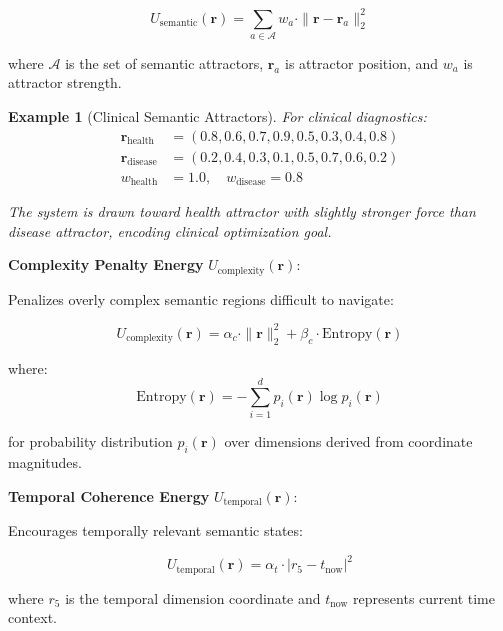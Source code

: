 \documentclass[12pt,a4paper]{article}
\newtheorem{example}{Example}
\begin{document}
\begin{equation}
U_{\text{semantic}}(\mathbf{r}) = \sum_{a \in \mathcal{A}} w_a \cdot \|\mathbf{r} - \mathbf{r}_a\|_2^2
\end{equation}

where $\mathcal{A}$ is the set of semantic attractors, $\mathbf{r}_a$ is attractor position, and $w_a$ is attractor strength.

\begin{example}[Clinical Semantic Attractors]
For clinical diagnostics:
\begin{align}
\mathbf{r}_{\text{health}} &= (0.8, 0.6, 0.7, 0.9, 0.5, 0.3, 0.4, 0.8) \\
\mathbf{r}_{\text{disease}} &= (0.2, 0.4, 0.3, 0.1, 0.5, 0.7, 0.6, 0.2) \\
w_{\text{health}} &= 1.0, \quad w_{\text{disease}} = 0.8
\end{align}

The system is drawn toward health attractor with slightly stronger force than disease attractor, encoding clinical optimization goal.
\end{example}

\textbf{Complexity Penalty Energy} $U_{\text{complexity}}(\mathbf{r})$:

Penalizes overly complex semantic regions difficult to navigate:

\begin{equation}
U_{\text{complexity}}(\mathbf{r}) = \alpha_c \cdot \|\mathbf{r}\|_2^2 + \beta_c \cdot \text{Entropy}(\mathbf{r})
\end{equation}

where:
\begin{equation}
\text{Entropy}(\mathbf{r}) = -\sum_{i=1}^d p_i(\mathbf{r}) \log p_i(\mathbf{r})
\end{equation}

for probability distribution $p_i(\mathbf{r})$ over dimensions derived from coordinate magnitudes.

\textbf{Temporal Coherence Energy} $U_{\text{temporal}}(\mathbf{r})$:

Encourages temporally relevant semantic states:

\begin{equation}
U_{\text{temporal}}(\mathbf{r}) = \alpha_t \cdot |r_5 - t_{\text{now}}|^2
\end{equation}

where $r_5$ is the temporal dimension coordinate and $t_{\text{now}}$ represents current time context.
\end{document}
